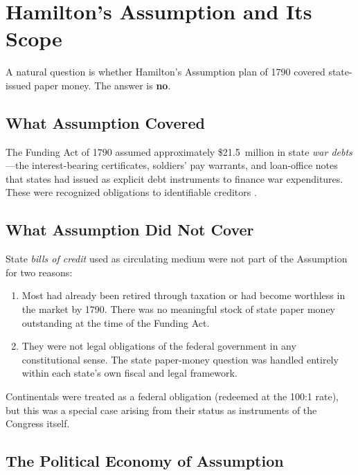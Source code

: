 \documentclass[12pt]{article}
\begin{document}
\section{Hamilton's Assumption and Its Scope}

A natural question is whether Hamilton's Assumption plan of 1790 covered
state-issued paper money.  The answer is \textbf{no}.

\subsection{What Assumption Covered}

The Funding Act of 1790 assumed approximately \$21.5~million in state
\emph{war debts}---the interest-bearing certificates, soldiers' pay warrants,
and loan-office notes that states had issued as explicit debt instruments to
finance war expenditures.  These were recognized obligations to identifiable
creditors \citep{Ferguson1961, Edling2014, Perkins1994}.

\subsection{What Assumption Did Not Cover}

State \textit{bills of credit} used as circulating medium were not part of the
Assumption for two reasons:
\begin{enumerate}
  \item Most had already been retired through taxation or had become worthless
    in the market by 1790.  There was no meaningful stock of state paper
    money outstanding at the time of the Funding Act.
  \item They were not legal obligations of the federal government in any
    constitutional sense.  The state paper-money question was handled
    entirely within each state's own fiscal and legal framework.
\end{enumerate}

Continentals were treated as a federal obligation (redeemed at the 100:1
rate), but this was a special case arising from their status as instruments
of the Congress itself.

\subsection{The Political Economy of Assumption}
\end{document}

